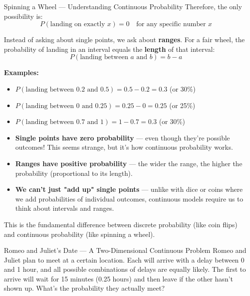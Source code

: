 \begin{itemize}
\begin{exampleboxbreak}{Spinning a Wheel — Understanding Continuous Probability}
Therefore, the only possibility is:
\[
P(\text{landing on exactly } x) = 0 \quad \text{for any specific number } x
\]


Instead of asking about single points, we ask about \textbf{ranges}. For a fair wheel, the probability of landing in an interval equals the \textbf{length} of that interval:
\[
P(\text{landing between } a \text{ and } b) = b - a
\]

\textbf{Examples:}
\begin{itemize}
    \item $P(\text{landing between } 0.2 \text{ and } 0.5) = 0.5 - 0.2 = 0.3$ (or 30\%)
    \item $P(\text{landing between } 0 \text{ and } 0.25) = 0.25 - 0 = 0.25$ (or 25\%)
    \item $P(\text{landing between } 0.7 \text{ and } 1) = 1 - 0.7 = 0.3$ (or 30\%)
\end{itemize}


\begin{itemize}
  \item \textbf{Single points have zero probability} — even though they're possible outcomes! This seems strange, but it's how continuous probability works.

  \item \textbf{Ranges have positive probability} — the wider the range, the higher the probability (proportional to its length).

  \item \textbf{We can't just "add up" single points} — unlike with dice or coins where we add probabilities of individual outcomes, continuous models require us to think about intervals and ranges.
\end{itemize}

This is the fundamental difference between discrete probability (like coin flips) and continuous probability (like spinning a wheel).
\end{exampleboxbreak}

\begin{exampleboxbreak}{Romeo and Juliet's Date — A Two-Dimensional Continuous Problem}
Romeo and Juliet plan to meet at a certain location. Each will arrive with a delay between 0 and 1 hour, and all possible combinations of delays are equally likely. The first to arrive will wait for 15 minutes (0.25 hours) and then leave if the other hasn't shown up. What's the probability they actually meet?


\end{exampleboxbreak}
\end{itemize}
